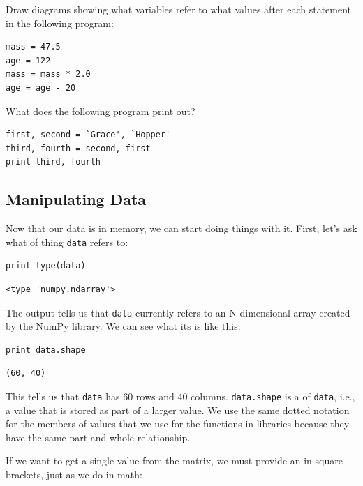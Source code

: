 \documentclass{book}
\begin{document}
\begin{challenge}
  Draw diagrams showing what variables refer to what values after each
  statement in the following program:

\begin{verbatim}
mass = 47.5
age = 122
mass = mass * 2.0
age = age - 20
\end{verbatim}
\end{challenge}

\begin{challenge}
  What does the following program print out?
\begin{verbatim}
first, second = `Grace', `Hopper'
third, fourth = second, first
print third, fourth
\end{verbatim}
\end{challenge}

\subsection{Manipulating Data}

Now that our data is in memory, we can start doing things with it.
First, let's ask what  of thing
\texttt{data} refers to:

\begin{verbatim}
print type(data)
\end{verbatim}

\begin{verbatim}
<type 'numpy.ndarray'>
\end{verbatim}

The output tells us that \texttt{data} currently refers to an
N-dimensional array created by the NumPy library. We can see what its
 is like this:

\begin{verbatim}
print data.shape
\end{verbatim}

\begin{verbatim}
(60, 40)
\end{verbatim}

This tells us that \texttt{data} has 60 rows and 40 columns.
\texttt{data.shape} is a  of \texttt{data},
i.e., a value that is stored as part of a larger value. We use the same
dotted notation for the members of values that we use for the functions
in libraries because they have the same part-and-whole relationship.

If we want to get a single value from the matrix, we must provide an
 in square brackets, just as we do in math:
\end{document}
